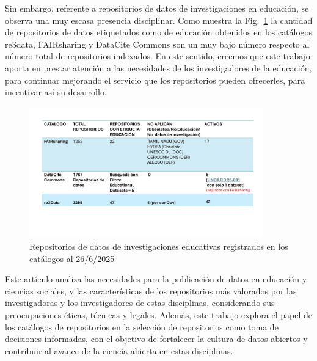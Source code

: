 \documentclass[runningheads]{llncs}
\begin{document}
Sin embargo, referente a repositorios de datos de investigaciones en educación, se observa una muy  escasa presencia disciplinar. Como muestra la Fig.~\ref{catalogos} la cantidad de repositorios de datos etiquetados como de educación obtenidos en  los catálogos re3data, FAIRsharing y DataCite Commons son un muy bajo número respecto al número total de repositorios indexados.
En este sentido, creemos que este trabajo aporta en prestar atención a las necesidades de los investigadores de la educación, para continuar mejorando el servicio que los repositorios pueden ofrecerles, para incentivar así su desarrollo.


\begin{figure}[h]
\includegraphics[width=0.9\textwidth]{catalogos.jpg}
\caption{Repositorios de datos de investigaciones educativas registrados en los catálogos al 26/6/2025} \label{catalogos}
\end{figure}

Este artículo analiza las necesidades para la publicación de datos en educación y ciencias sociales, y las características  de los repositorios más valorados por las investigadoras y los investigadores de estas disciplinas, considerando sus preocupaciones éticas, técnicas y legales. Además, este trabajo explora el papel de los catálogos de repositorios en la selección de repositorios como toma de decisiones informadas, con el objetivo de fortalecer la cultura de datos abiertos y contribuir al avance de la ciencia abierta en estas disciplinas.\\
\end{document}
